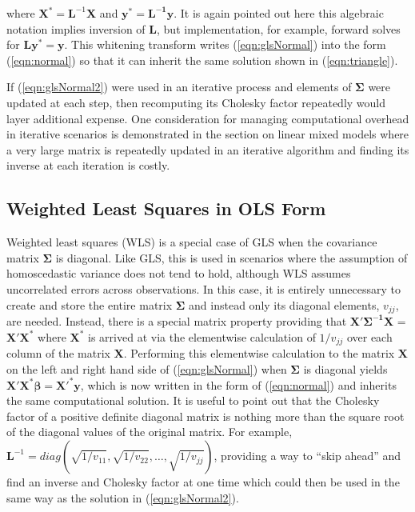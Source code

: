 \documentclass[12pt]{article}
\begin{document}
\noindent where $\bm{X}^{*} = \bm{L}^{-1}\bm{X}$ and $\bm{y}^* = \bm{L^{-1}}\bm{y}$. It is again pointed out here this algebraic notation implies inversion of $\bm{L}$, but implementation, for example, forward solves for $\bm{L}\bm{y}^* = \bm{y}$. This whitening transform writes (\ref{eqn:glsNormal}) into the form (\ref{eqn:normal}) so that it can inherit the same solution shown in (\ref{eqn:triangle}). 

If (\ref{eqn:glsNormal2}) were used in an iterative process and elements of $\bm{\Sigma}$ were updated at each step, then recomputing its Cholesky factor repeatedly would layer additional expense. One consideration for managing computational overhead in iterative scenarios is demonstrated in the section on linear mixed models where a very large matrix is repeatedly updated in an iterative algorithm and finding its inverse at each iteration is costly. 

\subsection*{Weighted Least Squares in OLS Form}

Weighted least squares (WLS) is a special case of GLS when the covariance matrix $\bm{\Sigma}$ is diagonal. Like GLS, this is used in scenarios where the assumption of homoscedastic variance does not tend to hold, although WLS assumes uncorrelated errors across observations. In this case, it is entirely unnecessary to create and store the entire matrix $\bm{\Sigma}$ and instead only its diagonal elements, $v_{jj}$, are needed. Instead, there is a special matrix property providing that $\bm{X'\Sigma^{-1}X}$ =  $\bm{X'X^*}$ where $\bm{X}^*$ is arrived at via the elementwise calculation of $1/v_{jj}$ over each column of the matrix $\bm{X}$. Performing this elementwise calculation to the matrix $\bm{X}$ on the left and right hand side of (\ref{eqn:glsNormal}) when $\bm{\Sigma}$ is diagonal yields $\bm{X'X^*}\bm{\beta} = \bm{X'^{*}y}$, which is now written in the form of (\ref{eqn:normal}) and inherits the same computational solution. It is useful to point out that the Cholesky factor of a positive definite diagonal matrix is nothing more than the square root of the diagonal values of the original matrix. For example, $\bm{L}^{-1} = diag(\sqrt{1/v_{11}},\sqrt{1/v_{22}}, \ldots, \sqrt{1/v_{jj}})$, providing a way to ``skip ahead'' and find an inverse and Cholesky factor at one time which could then be used in the same way as the solution in (\ref{eqn:glsNormal2}). 
\end{document}
